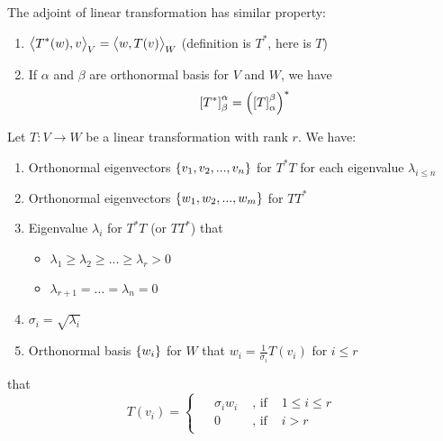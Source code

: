 \begin{theorem}
    The adjoint of linear transformation has similar property:
\begin{enumerate}
    \item $\left\langle \displaystyle T^*(w), v \right\rangle_V = \left\langle \displaystyle w, T(v) \right\rangle_W$ (definition is $T^*$, here is $T$)
    \item If $\alpha$ and $\beta$ are orthonormal basis for $V$ and $W$, we have \begin{equation}
        \coordinate{T^*}_\beta^\alpha = \left(\coordinate{T}_\alpha^\beta\right)^*
    \end{equation}
\end{enumerate}
\end{theorem}



\begin{theorem}[SVD]
    Let $T: V \rightarrow W$ be a linear transformation with rank $r$. We have:
    \begin{enumerate}
        \item Orthonormal eigenvectors $\set{v_1, v_2, ..., v_n}$ for $T^*T$ for each eigenvalue $\lambda_{i\leq n}$
        \item Orthonormal eigenvectors $\set{w_1, w_2, ..., w_m}$ for $TT^*$
        \item Eigenvalue $\lambda_i$ for $T^*T$ (or $TT^*$) that
                \begin{itemize}
                    \item $\lambda_1 \geq \lambda_2 \geq ... \geq \lambda_r > 0$
                    \item $\lambda_{r+1} = ... = \lambda_n = 0$
                \end{itemize}
        \item $\sigma_i = \sqrt{\lambda_i}$
        \item Orthonormal basis $\set{w_i}$ for $W$ that $\displaystyle w_i = \frac{1}{\sigma_i} T(v_i)$ for $i \leq r$
    \end{enumerate} that 
    \begin{equation}
        T(v_i) = \begin{cases}
        \begin{aligned}
            &\sigma_i w_i & \text { , if } & 1 \leq i \leq r \\
            & 0 & \text{ , if } & i > r
        \end{aligned}            
        \end{cases}
    \end{equation}
\end{theorem}

